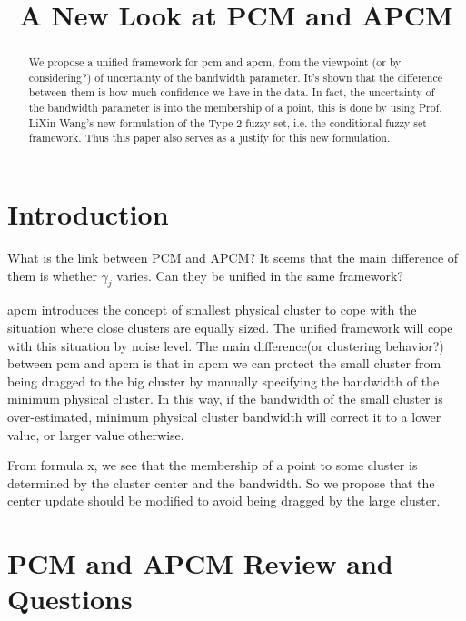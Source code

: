 \documentclass[journal]{IEEEtran}
\date{}
\title{A New Look at PCM and APCM}
\begin{document}
\maketitle
\begin{abstract}
We propose a unified framework for pcm and apcm, from the viewpoint (or by considering?) of uncertainty of the bandwidth parameter. It's shown that the difference between them is how much confidence we have in the data. In fact, the uncertainty of the bandwidth parameter is into the membership of  a point, this is done by using Prof. LiXin Wang's new formulation of the Type 2 fuzzy set, i.e. the conditional fuzzy set framework. Thus this paper also serves as a justify for this new formulation.
\end{abstract}

\section{Introduction}
\label{sec-1}

What is the link between PCM and APCM?
It seems that the main difference of them is whether $\gamma_j$ varies. Can they be unified in the same framework?

apcm introduces the concept of smallest physical cluster to cope with the situation where close clusters are equally sized. The unified framework will cope with this situation by noise level.
The main difference(or clustering behavior?) between pcm and apcm is that in apcm we can protect the small cluster from being dragged to the big cluster by manually specifying the bandwidth of the  minimum physical cluster. In this way, if the bandwidth of the small cluster is over-estimated, minimum physical cluster bandwidth will correct it to a lower value, or larger value otherwise.

From formula x, we see that the membership of a point to some cluster is determined by the cluster center and the bandwidth. So we propose that the center update should be modified to avoid being dragged by the large cluster.

\section{PCM and APCM Review and Questions}
\label{sec-2}
\end{document}
